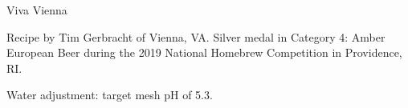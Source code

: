 \begin{recipe}{Viva Vienna} %

\begin{aboutblock}
Recipe by Tim Gerbracht of Vienna, VA. Silver medal in Category 4: Amber European
Beer during the 2019 National Homebrew Competition in Providence, RI. \sourceaha
\end{aboutblock}


\begin{methodandtiming}
 
\begin{mashsteps}
\end{mashsteps}

\begin{fermentationsteps}
\end{fermentationsteps}

\begin{directions}
Water adjustment: target mesh pH of 5.3.
\end{directions}

\end{methodandtiming}

\recipebreak

\begin{ingredientsblock}

\begin{malts}
\end{malts}

\begin{hops}
\end{hops}


\end{ingredientsblock}

\end{recipe}
